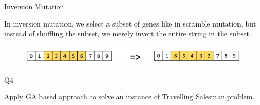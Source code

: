 \documentclass[12pt]{article}
\renewcommand{\_}{\kern-1.5pt\textunderscore\kern-1.5pt}
\begin{document}
\setlength{\parskip}{8.04pt}
\par


\vspace{\baselineskip}
\setlength{\parskip}{7.2pt}
\begin{adjustwidth}{0.03in}{0.03in}
{\fontsize{14pt}{16.8pt}\selectfont \uline{Inversion Mutation}\par}\par

\end{adjustwidth}

\begin{adjustwidth}{0.03in}{0.03in}
{\fontsize{11pt}{13.2pt}\selectfont In inversion mutation, we select a subset of genes like in scramble mutation, but instead of shuffling the subset, we merely invert the entire string in the subset.\par}\par

\end{adjustwidth}




\begin{figure}[H]
	\begin{Center}
		\includegraphics[width=6.25in,height=0.4in]{./media/image20.png}
	\end{Center}
\end{figure}



\setlength{\parskip}{8.04pt}
\par


\vspace{\baselineskip}

\vspace{\baselineskip}
\begin{Center}
{\fontsize{28pt}{33.6pt}\selectfont Q4\par}
\end{Center}\par

{\fontsize{14pt}{16.8pt}\selectfont Apply GA based approach to solve an instance of Travelling Salesman problem.\par}\par
\end{document}
